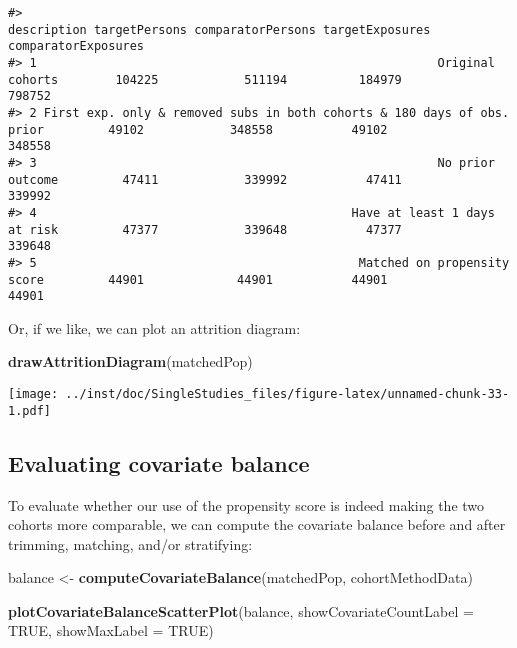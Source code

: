 \documentclass[]{article}
\newenvironment{Shaded}{\begin{snugshade}}{\end{snugshade}}
\newcommand{\DataTypeTok}[1]{\textcolor[rgb]{0.13,0.29,0.53}{#1}}
\newcommand{\KeywordTok}[1]{\textcolor[rgb]{0.13,0.29,0.53}{\textbf{#1}}}
\newcommand{\NormalTok}[1]{#1}
\newcommand{\OtherTok}[1]{\textcolor[rgb]{0.56,0.35,0.01}{#1}}
\newcommand{\StringTok}[1]{\textcolor[rgb]{0.31,0.60,0.02}{#1}}
\begin{document}
\begin{verbatim}
#>                                                               description targetPersons comparatorPersons targetExposures comparatorExposures
#> 1                                                        Original cohorts        104225            511194          184979              798752
#> 2 First exp. only & removed subs in both cohorts & 180 days of obs. prior         49102            348558           49102              348558
#> 3                                                        No prior outcome         47411            339992           47411              339992
#> 4                                            Have at least 1 days at risk         47377            339648           47377              339648
#> 5                                             Matched on propensity score         44901             44901           44901               44901
\end{verbatim}

Or, if we like, we can plot an attrition diagram:

\begin{Shaded}
\begin{Highlighting}[]
\KeywordTok{drawAttritionDiagram}\NormalTok{(matchedPop)}
\end{Highlighting}
\end{Shaded}

\texttt{[image: ../inst/doc/SingleStudies\_files/figure-latex/unnamed-chunk-33-1.pdf]}

\hypertarget{evaluating-covariate-balance}{%
\subsection{Evaluating covariate
balance}\label{evaluating-covariate-balance}}

To evaluate whether our use of the propensity score is indeed making the
two cohorts more comparable, we can compute the covariate balance before
and after trimming, matching, and/or stratifying:

\begin{Shaded}
\begin{Highlighting}[]
\NormalTok{balance <-}\StringTok{ }\KeywordTok{computeCovariateBalance}\NormalTok{(matchedPop, cohortMethodData)}
\end{Highlighting}
\end{Shaded}

\begin{Shaded}
\begin{Highlighting}[]
\KeywordTok{plotCovariateBalanceScatterPlot}\NormalTok{(balance, }\DataTypeTok{showCovariateCountLabel =} \OtherTok{TRUE}\NormalTok{, }\DataTypeTok{showMaxLabel =} \OtherTok{TRUE}\NormalTok{)}
\end{Highlighting}
\end{Shaded}
\end{document}
